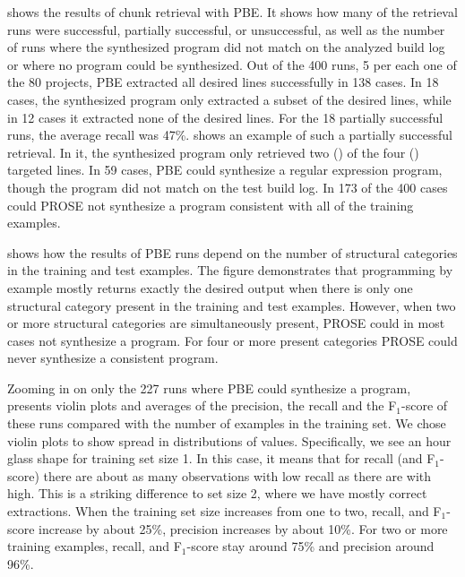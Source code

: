 \documentclass[10pt,journal,compsoc]{IEEEtran}
\begin{document}
 shows the results of chunk
retrieval with PBE.
It shows how many of the retrieval runs were successful,
partially successful, or unsuccessful,
as well as the number of runs where the
synthesized program did not match on the analyzed build log or where
no program could be synthesized.
Out of the 400 runs, 5 per each one of the 80 projects,
PBE extracted all desired lines successfully in 138 cases.
In 18 cases, the synthesized program only extracted a
subset of the desired lines, while in 12 cases it extracted none of
the desired lines.
For the 18 partially successful runs, the average recall
was 47\%.
 shows an example of such
a partially successful retrieval.
In it, the synthesized program only
retrieved two ()
of the four () targeted lines.
In 59 cases, PBE could synthesize a regular expression program, though
the program did not match on the test build log.
In 173 of the 400 cases
could PROSE not synthesize a program consistent with all of the training
examples.

 shows how
the results of PBE
runs depend on the number of structural categories in the training and
test examples.
The figure demonstrates that programming by example mostly
returns exactly the desired output when there is only one
structural category present in the training and test examples.
However, when
two or more structural categories are simultaneously present,
PROSE could in most cases not synthesize a program.
For four or more present
categories PROSE could never synthesize a consistent program.

Zooming in on only the 227 runs where PBE could synthesize a program,
presents violin plots and averages of the precision, the recall
and the F$_{1}$-score
of these runs compared with the number of examples in the training set.
We chose violin plots to show spread in distributions of values.
Specifically, we see an hour glass shape for training set size 1.
In this case, it means that for recall (and F$_1$-score) there are about
as many observations with low recall as there are with high.
This is a striking difference to set size 2, where we have mostly
correct extractions.
When the training set
size increases from one to two, recall, and F$_{1}$-score increase by
about 25\%, precision increases by about 10\%.
For two or more
training examples, recall, and F$_{1}$-score stay around 75\% and
precision around 96\%.
\end{document}
